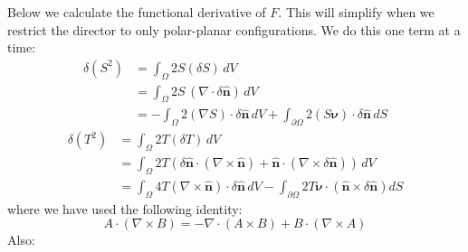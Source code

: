 \documentclass[reqno]{article}
\newcommand{\n}{\hat{\mathbf{n}}}
\begin{document}
Below we calculate the functional derivative of $F$.
This will simplify when we restrict the director to only polar-planar configurations.
We do this one term at a time:
\begin{equation}
\begin{split}
    \delta (S^2)
    &=
    \int_{\Omega} 2 S \left( \delta S \right) \, dV \\
    &=
    \int_{\Omega} 2S \, \left( \nabla \cdot \delta \n \right) \, dV \\
    &=
    -\int_{\Omega} 2\left(\nabla S \right) \cdot \delta \n \, dV
    + \int_{\partial \Omega} 2 \left( S  \boldsymbol\nu \right) \cdot \delta \n  \, dS
\end{split}
\end{equation}
\begin{equation}
\begin{split}
    \delta (T^2)
    &=
    \int_{\Omega} 2T \left( \delta T \right) \, dV \\
    &=
    \int_{\Omega} 2T \left( 
        \delta \n \cdot \left( \nabla \times \n \right)
        + \n \cdot \left( \nabla \times \delta \n \right)
    \right) \, dV \\
    &=
    \int_{\Omega} 4T \left( \nabla \times \n \right) \cdot \delta \n \, dV
    -
    \int_{\partial \Omega} 2T \boldsymbol\nu \cdot \left(\n \times \delta \n\right) dS
\end{split}
\end{equation}
where we have used the following identity:
\begin{equation}
    A \cdot \left( \nabla \times B \right)
    =
    -\nabla \cdot \left(A \times B\right)
    + B \cdot \left( \nabla \times A \right)
\end{equation}
Also:
\end{document}
